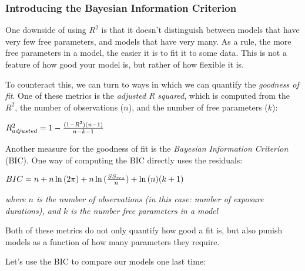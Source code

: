 \documentclass[11pt]{article}
\begin{document}
    \subsubsection{Introducing the Bayesian Information
Criterion}\label{introducing-the-bayesian-information-criterion}

One downside of using \(R^{2}\) is that it doesn't distinguish between
models that have very few free parameters, and models that have very
many. As a rule, the more free parameters in a model, the easier it is
to fit it to some data. This is not a feature of how good your model is,
but rather of how flexible it is.

To counteract this, we can turn to ways in which we can quantify the
\emph{goodness of fit}. One of these metrics is the \emph{adjusted R
squared}, which is computed from the \(R^{2}\), the number of
observations (\(n\)), and the number of free parameters (\(k\)):

\(R^{2}_{adjusted} = 1 - {{(1 - R^{2}) (n - 1)} \over {n - k - 1}}\)

Another measure for the goodness of fit is the \emph{Bayesian
Information Criterion} (BIC). One way of computing the BIC directly uses
the residuals:

\(BIC = n + n \ln{(2 \pi)} + n \ln{({{SS_{res}} \over {n}})} + \ln{(n)}(k + 1)\)

\emph{where \(n\) is the number of observations (in this case: number of
exposure durations), and \(k\) is the number free parameters in a model}

Both of these metrics do not only quantify how good a fit is, but also
punish models as a function of how many parameters they require.

Let's use the BIC to compare our models one last time:
\end{document}
